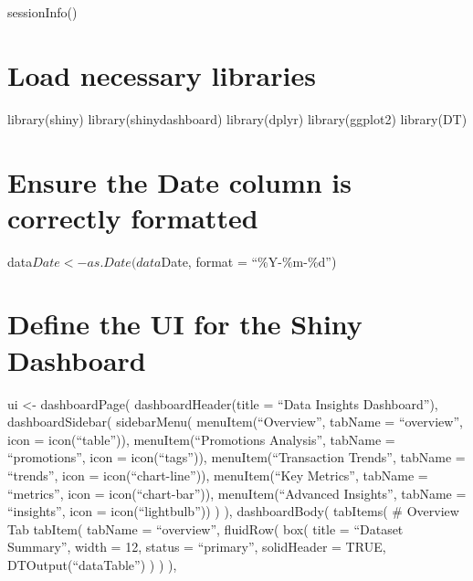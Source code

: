 \documentclass[
]{article}
\begin{document}
sessionInfo()

\section{Load necessary libraries}\label{load-necessary-libraries-1}

library(shiny) library(shinydashboard) library(dplyr) library(ggplot2)
library(DT)

\section{Ensure the Date column is correctly
formatted}\label{ensure-the-date-column-is-correctly-formatted}

data\(Date <- as.Date(data\)Date, format = ``\%Y-\%m-\%d'')

\section{Define the UI for the Shiny
Dashboard}\label{define-the-ui-for-the-shiny-dashboard}

ui \textless- dashboardPage( dashboardHeader(title = ``Data Insights
Dashboard''), dashboardSidebar( sidebarMenu( menuItem(``Overview'',
tabName = ``overview'', icon = icon(``table'')), menuItem(``Promotions
Analysis'', tabName = ``promotions'', icon = icon(``tags'')),
menuItem(``Transaction Trends'', tabName = ``trends'', icon =
icon(``chart-line'')), menuItem(``Key Metrics'', tabName = ``metrics'',
icon = icon(``chart-bar'')), menuItem(``Advanced Insights'', tabName =
``insights'', icon = icon(``lightbulb'')) ) ), dashboardBody( tabItems(
\# Overview Tab tabItem( tabName = ``overview'', fluidRow( box( title =
``Dataset Summary'', width = 12, status = ``primary'', solidHeader =
TRUE, DTOutput(``dataTable'') ) ) ),
\end{document}
